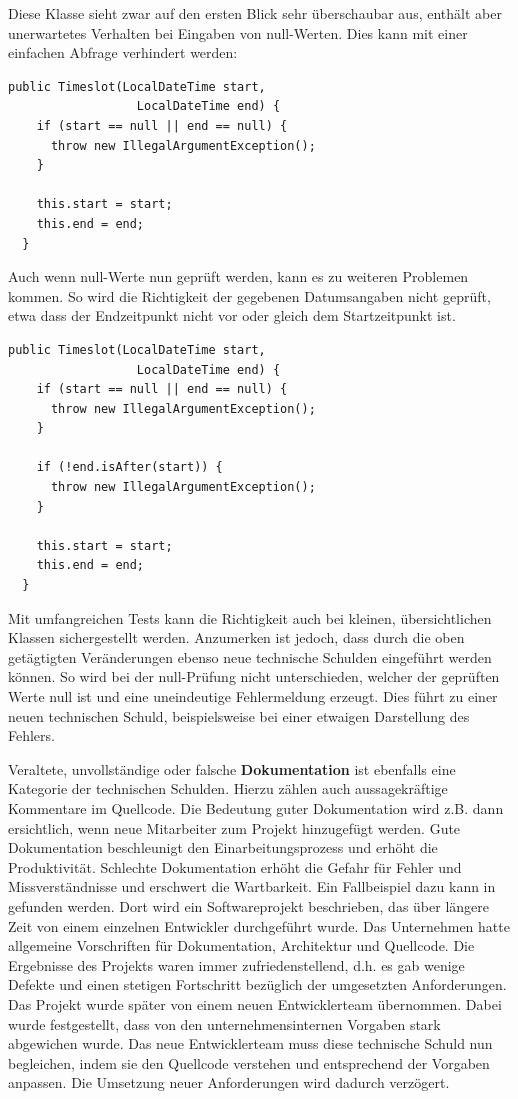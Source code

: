 \documentclass[acmtog]{acmart}
\begin{document}
Diese Klasse sieht zwar auf den ersten Blick sehr überschaubar aus,
enthält aber unerwartetes Verhalten bei Eingaben von null-Werten.
Dies kann mit einer einfachen Abfrage verhindert werden:

\begin{lstlisting}[frame=single,breaklines=true]
  public Timeslot(LocalDateTime start,
                  LocalDateTime end) {
    if (start == null || end == null) {
      throw new IllegalArgumentException();
    }

    this.start = start;
    this.end = end;
  }
\end{lstlisting}

Auch wenn null-Werte nun geprüft werden, kann es zu weiteren Problemen
kommen. So wird die Richtigkeit der gegebenen Datumsangaben nicht
geprüft, etwa dass der Endzeitpunkt nicht vor oder gleich dem
Startzeitpunkt ist.

\begin{lstlisting}[frame=single,breaklines=true]
  public Timeslot(LocalDateTime start,
                  LocalDateTime end) {
    if (start == null || end == null) {
      throw new IllegalArgumentException();
    }

    if (!end.isAfter(start)) {
      throw new IllegalArgumentException();
    }

    this.start = start;
    this.end = end;
  }
\end{lstlisting}

Mit umfangreichen Tests kann die Richtigkeit auch bei kleinen, übersichtlichen
Klassen sichergestellt werden. Anzumerken ist jedoch, dass durch die oben
getägtigten Veränderungen ebenso neue technische Schulden eingeführt werden können.
So wird bei der null-Prüfung nicht unterschieden, welcher der geprüften Werte null ist
und eine uneindeutige Fehlermeldung erzeugt. Dies führt zu einer neuen technischen
Schuld, beispielsweise bei einer etwaigen Darstellung des Fehlers.

Veraltete, unvollständige oder falsche \textbf{Dokumentation} ist ebenfalls eine
Kategorie der technischen Schulden. Hierzu zählen auch aussagekräftige
Kommentare im Quellcode. Die Bedeutung guter Dokumentation wird z.B. dann
ersichtlich, wenn neue Mitarbeiter zum Projekt hinzugefügt werden. Gute
Dokumentation beschleunigt den Einarbeitungsprozess und erhöht die
Produktivität. Schlechte Dokumentation erhöht die Gefahr für Fehler und
Missverständnisse und erschwert die Wartbarkeit. Ein Fallbeispiel dazu kann
in \cite{Brown10} gefunden werden. Dort wird ein Softwareprojekt beschrieben, das über
längere Zeit von einem einzelnen Entwickler durchgeführt wurde. Das
Unternehmen hatte allgemeine Vorschriften für Dokumentation, Architektur und
Quellcode. Die Ergebnisse des Projekts waren immer zufriedenstellend, d.h.
es gab wenige Defekte und einen stetigen Fortschritt bezüglich der
umgesetzten Anforderungen. Das Projekt wurde später von einem neuen
Entwicklerteam übernommen. Dabei wurde festgestellt, dass von den
unternehmensinternen Vorgaben stark abgewichen wurde. Das neue
Entwicklerteam muss diese technische Schuld nun begleichen, indem sie den
Quellcode verstehen und entsprechend der Vorgaben anpassen. Die Umsetzung
neuer Anforderungen wird dadurch verzögert.
\end{document}
